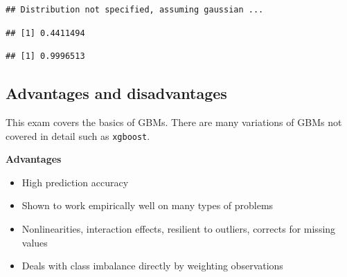 \documentclass[openany]{book}
\newenvironment{Shaded}{\begin{snugshade}}{\end{snugshade}}
\newcommand{\DataTypeTok}[1]{\textcolor[rgb]{0.13,0.29,0.53}{#1}}
\newcommand{\DecValTok}[1]{\textcolor[rgb]{0.00,0.00,0.81}{#1}}
\newcommand{\KeywordTok}[1]{\textcolor[rgb]{0.13,0.29,0.53}{\textbf{#1}}}
\newcommand{\NormalTok}[1]{#1}
\newcommand{\OperatorTok}[1]{\textcolor[rgb]{0.81,0.36,0.00}{\textbf{#1}}}
\newcommand{\StringTok}[1]{\textcolor[rgb]{0.31,0.60,0.02}{#1}}
\providecommand{\tightlist}{%
  \setlength{\itemsep}{0pt}\setlength{\parskip}{0pt}}
\begin{document}
\begin{verbatim}
## Distribution not specified, assuming gaussian ...
\end{verbatim}

\begin{Shaded}
\end{Shaded}

\begin{verbatim}
## [1] 0.4411494
\end{verbatim}

\begin{Shaded}
\end{Shaded}

\begin{verbatim}
## [1] 0.9996513
\end{verbatim}

\hypertarget{advantages-and-disadvantages-4}{%
\subsection{Advantages and disadvantages}\label{advantages-and-disadvantages-4}}

This exam covers the basics of GBMs. There are many variations of GBMs not covered in detail such as \texttt{xgboost}.

\textbf{Advantages}

\begin{itemize}
\tightlist
\item
  High prediction accuracy
\item
  Shown to work empirically well on many types of problems
\item
  Nonlinearities, interaction effects, resilient to outliers, corrects for missing values
\item
  Deals with class imbalance directly by weighting observations
\end{itemize}
\end{document}
